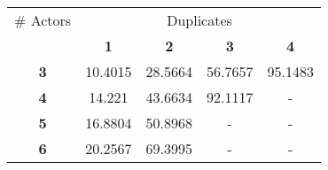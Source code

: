 \begin{tabular}{ | c | c | c | c | c | }
\hline
\# Actors & \multicolumn{4}{|c|}{Duplicates} \\ \cline{2-5}
 & {\bf1} & {\bf2} & {\bf3} & {\bf4} \\ \hline \hline
{\bf 3} & 10.4015 & 28.5664 & 56.7657 & 95.1483 \\ \hline
{\bf 4} & 14.221 & 43.6634 & 92.1117 & - \\ \hline
{\bf 5} & 16.8804 & 50.8968 & - & - \\ \hline
{\bf 6} & 20.2567 & 69.3995 & - & - \\ \hline
\end{tabular}
